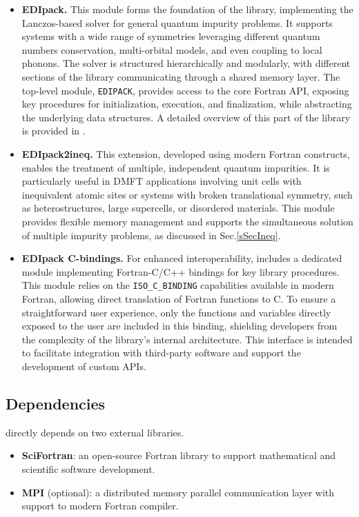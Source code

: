 \documentclass[edipack_sp.tex]{subfiles}
\begin{document}
\begin{itemize}
\item{\bf EDIpack.}
  This module forms the foundation of the library, implementing the 
  Lanczos-based solver for general quantum impurity problems. It 
  supports systems with a wide range of symmetries leveraging different quantum numbers conservation, multi-orbital models, and even coupling to local 
  phonons. The \NAME solver is structured hierarchically and modularly, 
  with different sections of the library communicating through a shared 
  memory layer. The top-level module, {\tt EDIPACK}, provides access 
  to the core Fortran API, exposing key procedures for initialization, 
  execution, and finalization, while abstracting the underlying data 
  structures. A detailed overview of this part of the library is 
  provided in .
  
\item{\bf EDIpack2ineq.}
  This extension, developed using modern Fortran constructs,
  enables the treatment of multiple, independent quantum 
impurities. It is particularly useful in DMFT applications involving 
unit cells with inequivalent atomic sites or systems with broken 
translational symmetry, such as heterostructures, large supercells, 
or disordered materials. This module provides flexible memory 
management and supports the simultaneous solution of multiple impurity 
problems, as discussed in Sec.\ref{sSecIneq}.



\item{\bf EDIpack C-bindings.}
  For enhanced interoperability, \NAME includes a dedicated module 
implementing Fortran-C/C++ bindings for key library procedures. This 
module relies on the {\tt ISO\_C\_BINDING} capabilities available in 
modern Fortran, allowing direct translation of Fortran functions to C. 
To ensure a straightforward user experience, only the functions and 
variables directly exposed to the user are included in this binding, 
shielding developers from the complexity of the library's internal 
architecture. This interface is intended to facilitate integration 
with third-party software and support the development of custom APIs.
\end{itemize}




\subsection{Dependencies}\label{sSecInstallDependencies}
\NAME directly depends on two external libraries.
\begin{itemize}
\item {\bf SciFortran}: an open-source Fortran library to support
  mathematical and scientific software development. 
\item {\bf MPI} (optional): a distributed memory parallel communication layer with support to modern Fortran compiler.
\end{itemize}
 
\end{document}
